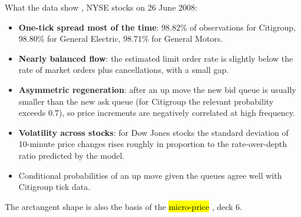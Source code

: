 \documentclass[aspectratio=169,10pt]{beamer}
\begin{document}
\begin{frame}{What the data show}
  \small
  \citet{cont2013price}, NYSE stocks on 26 June 2008:
  \begin{itemize}
    \item \textbf{One-tick spread most of the time}: 98.82\% of observations for Citigroup, 98.80\% for General Electric, 98.71\% for General Motors.
    \item \textbf{Nearly balanced flow}: the estimated limit order rate is slightly below the rate of market orders plus cancellations, with a small gap.
    \item \textbf{Asymmetric regeneration}: after an up move the new bid queue is usually smaller than the new ask queue (for Citigroup the relevant probability exceeds 0.7), so price increments are negatively correlated at high frequency.
    \item \textbf{Volatility across stocks}: for Dow Jones stocks the standard deviation of 10-minute price changes rises roughly in proportion to the rate-over-depth ratio predicted by the model.
    \item Conditional probabilities of an up move given the queues agree well with Citigroup tick data.
  \end{itemize}
  \vspace{0.2em}
  The arctangent shape is also the basis of the \hl{micro-price} \citep{stoikov2018micro}, deck 6.
\end{frame}
\end{document}
